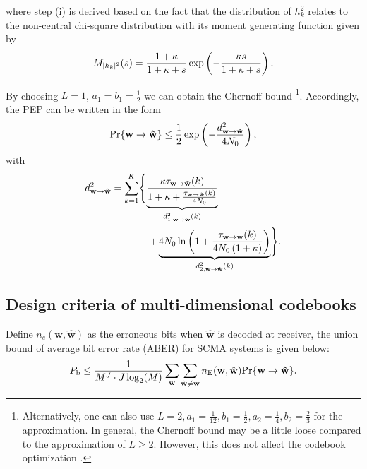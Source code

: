 \documentclass[journal]{IEEEtran}
\begin{document}
where step (i) is derived based on the fact that  the distribution of $h_k^2$ relates to the non-central chi-square distribution with its  moment  generating function   given by \cite{TellamburaEvaluation} 
\begin{equation}
 \small
 \label{momo}
M_{|h_k |^2} ( s) = \frac{1+\kappa}{1 +\kappa+ s}\exp \left(- \frac{\kappa s}{1 +\kappa + s} \right).
\end{equation}

By choosing $L =1$, $a_1 = b_1 =\frac{1}{2}$ we can obtain the Chernoff bound \footnote{Alternatively, one can also use $L =2, a_1 =\frac{1}{12},  b_1 =\frac{1}{2},a_2 =\frac{1}{4},  b_2 =\frac{2}{3}$ for the approximation.  In general, the  Chernoff bound may be a little loose compared to the approximation of $L \geq 2$. However, this does not affect the codebook optimization \cite{li2020design,yu2015optimized,chen2020design}. }. Accordingly, the PEP can be written in the form 
\begin{equation}
 \small
 \label{PEP_Raician2}
\begin{aligned} 
\text{Pr} \{\mathbf{w} \to \mathbf{\hat{w}}\}   \leq  \frac{1}{2} \exp \left( -{\frac{d_{ \mathbf{w} \to \mathbf{\hat{w}} }^2}{4N_0}}\right),
\end{aligned}
  \end{equation}
with 
\begin{equation}
 \small
 \label{d}
\begin{aligned} 
d_{ \mathbf{w} \to \mathbf{\hat{w}} }^2 = \sum \limits _{k=1}^K   &  \Bigg\{  {\underbrace{ { \frac{ \kappa {\tau _{{{\mathbf w}} \rightarrow {\tilde{\mathbf{w}}}}(k)}   }{1+ \kappa +\frac{{  \tau _{{{\mathbf w}} \rightarrow {\tilde{\mathbf{w}}}}(k)} }{4N_0} }    }  }_{d_{1, \mathbf{w} \to \mathbf{\hat{w}} }^2(k)} } \\ 
  & \; \; \; \; {+  \underbrace{ 4N_0   \ln \left(1+  \frac{{  \tau _{{{\mathbf w}} \rightarrow {\tilde{\mathbf{w}}}}(k)  }  }{4N_0 \left( 1+ \kappa\right)}   \right)}_{d_{2, \mathbf{w} \to \mathbf{\hat{w}} }^2(k)}  } \Bigg\}. 
\end{aligned}
  \end{equation}

     \subsection{Design criteria of multi-dimensional codebooks}    
  \label{designC}
    Define $n_e\left(\mathbf {w},\hat {\mathbf {w}}\right)$  as the erroneous bits when $\hat {\mathbf {w}}$ is decoded at receiver, the union bound of  average bit error rate (ABER) for SCMA systems is given below:
  \begin{equation}
  \label{ABER}
  \small
  \begin{aligned} P_{\text {b}} \leq \frac {1}{M^{J} \cdot J\log _{2}(M)}   \sum _{\mathbf {w}}\sum _{\hat {\mathbf {w}}\neq \mathbf {w}}{n_{\text {E}}(\mathbf {w},\hat {\mathbf {w}})}   \text{Pr} \{\mathbf{w} \to \mathbf{\hat{w}}\}. \\
  \end{aligned}
    \end{equation}
 
\end{document}
